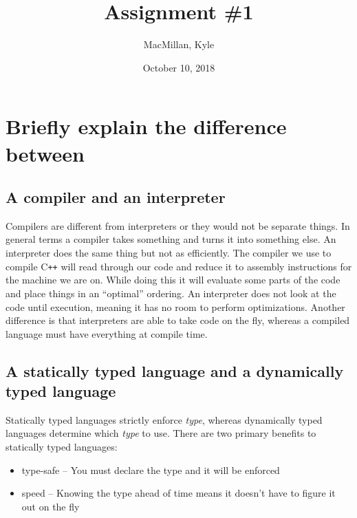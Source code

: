 \documentclass{article}
\title{\textbf{Assignment \#1}}
\author{MacMillan, Kyle}
\date{October 10, 2018}
\begin{document}
\maketitle
{}

\newpage
{}   %
\tableofcontents
{}

\newpage
\listoffigures
{}


\newpage
{}  %
\hypersetup{
    citecolor=blue,
    filecolor=black,
    linkcolor=blue,
    urlcolor=blue
}

\setcounter{page}{1}
\section[Problem 1]{Briefly explain the difference between}
\subsection[Compilers and Interpreters]{A compiler and an interpreter}
Compilers are different from interpreters or they would not be separate things. 
In general terms a compiler takes something and turns it into something else. 
An interpreter does the same thing but not as efficiently. The compiler we use 
to compile C\texttt{++} will read through our code and reduce it to assembly 
instructions for the machine we are on. While doing this it will evaluate some 
parts of the code and place things in an ``optimal'' ordering. An interpreter 
does not look at the code until execution, meaning it has no room to perform 
optimizations. Another difference is that interpreters are able to take code on 
the fly, whereas a compiled language must have everything at compile time. 

\subsection[Statically and Dynamically Typed Languages]{A statically typed 
language and a dynamically typed language}
Statically typed languages strictly enforce \textit{type}, whereas dynamically 
typed languages determine which \textit{type} to use. There are two primary 
benefits to statically typed languages:\\
\begin{itemize}
    \item type-safe -- You must declare the type and it will be enforced
    \item speed -- Knowing the type ahead of time means it doesn't have to 
    figure it out on the fly
\end{itemize}
\end{document}
